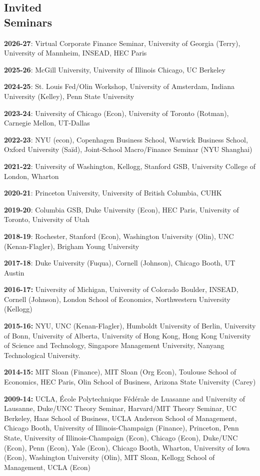 \documentclass[margin,line,11pt]{resume}
\begin{document}
\begin{resume}
   \section{\mysidestyle Invited \\Seminars }
\textbf{2026-27}: Virtual Corporate Finance Seminar, University of Georgia (Terry), University of Mannheim, INSEAD, HEC Paris

\textbf{2025-26}: McGill University, University of Illinois Chicago, UC Berkeley

\textbf{2024-25}:  St. Louis Fed/Olin Workshop, 
University of Amsterdam, Indiana University (Kelley), Penn State University  

\textbf{2023-24}:  University of Chicago (Econ), University of Toronto (Rotman), Carnegie Mellon, UT-Dallas

\textbf{2022-23}: NYU (econ), Copenhagen Business School, Warwick Business School, Oxford University (Sa\"id), Joint-School Macro/Finance Seminar (NYU Shanghai)

\textbf{2021-22}:  University of Washington, Kellogg, Stanford GSB, University College of London,  Wharton

\textbf{2020-21}: Princeton University,  University of British Columbia, CUHK

\textbf{2019-20}: Columbia GSB, Duke University (Econ),  HEC Paris,  University of Toronto, University of Utah

\textbf{2018-19}: Rochester, Stanford (Econ), Washington University (Olin), UNC (Kenan-Flagler), Brigham Young University

\textbf{2017-18}: Duke University (Fuqua), Cornell (Johnson), Chicago Booth,  UT Austin

\textbf{2016-17:} University of Michigan, University of Colorado Boulder, INSEAD, Cornell (Johnson), London School of Economics, Northwestern University (Kellogg) 

\textbf{2015-16:} NYU, UNC (Kenan-Flagler), Humboldt University of Berlin,  University of Bonn, University of Alberta, University of Hong Kong, Hong Kong University of Science and Technology,  Singapore Management University, Nanyang Technological University.


     \textbf{2014-15:} MIT Sloan (Finance), MIT Sloan (Org Econ),  Toulouse School of Economics, HEC Paris, Olin School of Business,  Arizona State University (Carey)


    \textbf{2009-14:} UCLA,  \'{E}cole Polytechnique F\'{e}d\'{e}rale de Luasanne and University of Lausanne, Duke/UNC Theory Seminar, Harvard/MIT Theory Seminar, UC Berkeley, Haas School of Business, UCLA Anderson School of Management, Chicago Booth,  University of Illinois-Champaign (Finance), Princeton,  Penn State,  University of Illinois-Champaign (Econ), Chicago (Econ), Duke/UNC (Econ), Penn (Econ), Yale (Econ), Chicago Booth, Wharton, University of Iowa (Econ),  Washington University (Olin),  MIT Sloan, Kellogg School of Management, UCLA (Econ)



\end{resume}
\end{document}
